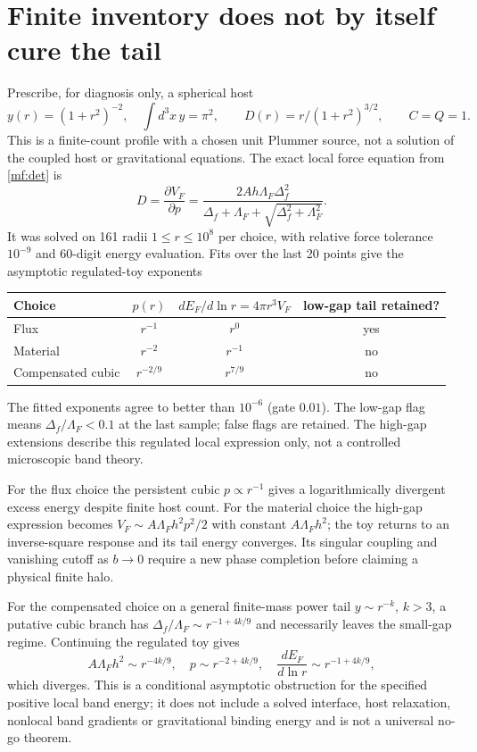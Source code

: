 \documentclass[11pt]{article}
\begin{document}
\section{Finite inventory does not by itself cure the tail}
Prescribe, for diagnosis only, a spherical host
\begin{equation}
 y(r)=(1+r^2)^{-2},\quad \int d^3x\,y=\pi^2,\qquad
 D(r)=r/(1+r^2)^{3/2},\qquad C=Q=1.
\end{equation}
This is a finite-count profile with a chosen unit Plummer source, not a
solution of the coupled host or gravitational equations. The exact local
force equation from \eqref{mf:det} is
\begin{equation}
 D=\frac{\partial V_F}{\partial p}
 =\frac{2Ah\Lambda_F\Delta_f^2}
 {\Delta_f+\Lambda_F+\sqrt{\Delta_f^2+\Lambda_F^2}}.
 \label{mf:tail}
\end{equation}
It was solved on 161 radii $1\le r\le10^8$ per choice, with relative
force tolerance $10^{-9}$ and 60-digit energy evaluation. Fits over the
last 20 points give the asymptotic regulated-toy exponents
\begin{center}
\begin{tabular}{lccc}
\toprule
Choice & $p(r)$ & $dE_F/d\ln r=4\pi r^3V_F$ & low-gap tail retained?\\
\midrule
Flux & $r^{-1}$ & $r^0$ & yes\\
Material & $r^{-2}$ & $r^{-1}$ & no\\
Compensated cubic & $r^{-2/9}$ & $r^{7/9}$ & no\\
\bottomrule
\end{tabular}
\end{center}
The fitted exponents agree to better than $10^{-6}$ (gate $0.01$).
The low-gap flag means $\Delta_f/\Lambda_F<0.1$ at the last sample;
false flags are retained. The high-gap extensions describe this regulated
local expression only, not a controlled microscopic band theory.

For the flux choice the persistent cubic $p\propto r^{-1}$ gives a
logarithmically divergent excess energy despite finite host count. For
the material choice the high-gap expression becomes
$V_F\sim A\Lambda_Fh^2p^2/2$ with constant $A\Lambda_Fh^2$;
the toy returns to an inverse-square response and its tail energy converges.
Its singular coupling and vanishing cutoff as $b\to0$ require a new phase
completion before claiming a physical finite halo.

For the compensated choice on a general finite-mass power tail
$y\sim r^{-k}$, $k>3$, a putative cubic branch has
$\Delta_f/\Lambda_F\sim r^{-1+4k/9}$ and necessarily leaves the
small-gap regime. Continuing the regulated toy gives
\begin{equation}
 A\Lambda_Fh^2\sim r^{-4k/9},\quad
 p\sim r^{-2+4k/9},\quad
 \frac{dE_F}{d\ln r}\sim r^{-1+4k/9},
\end{equation}
which diverges. This is a conditional asymptotic obstruction for the
specified positive local band energy; it does not include a solved
interface, host relaxation, nonlocal band gradients or gravitational
binding energy and is not a universal no-go theorem.
\end{document}
